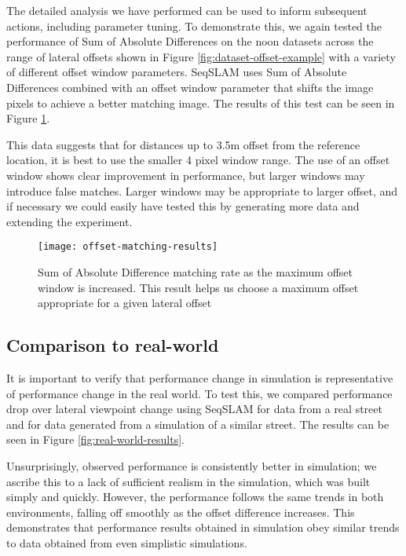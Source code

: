 \documentclass[letterpaper, 10 pt, conference]{ieeeconf}  %
\begin{document}
The detailed analysis we have performed can be used to inform subsequent actions, including parameter tuning. To demonstrate this, we again tested the performance of Sum of Absolute Differences on the noon datasets across the range of lateral offsets shown in Figure \ref{fig:dataset-offset-example} with a variety of different offset window parameters. SeqSLAM uses Sum of Absolute Differences combined with an offset window parameter that shifts the image pixels to achieve a better matching image. The results of this test can be seen in Figure \ref{fig:offset-matching-param-results}.

This data suggests that for distances up to 3.5m offset from the reference location, it is best to use the smaller 4 pixel window range. The use of an offset window shows clear improvement in performance, but larger windows may  introduce false matches. Larger windows may be appropriate to larger offset, and if necessary we could easily have tested this by generating more data and extending the experiment.

\begin{figure}[t]
    \texttt{[image: offset-matching-results]}
    \caption{Sum of Absolute Difference matching rate as the maximum offset window is increased. This result helps us choose a maximum offset appropriate for a given lateral offset}
    \label{fig:offset-matching-param-results}
\end{figure}

\subsection{Comparison to real-world}

It is important to verify that performance change in simulation is representative of performance change in the real world. To test this, we compared performance drop over lateral viewpoint change using SeqSLAM for data from a real street and for data generated from a simulation of a similar street. The results can be seen in Figure \ref{fig:real-world-results}.

Unsurprisingly, observed performance is consistently better in simulation; we ascribe this to a lack of sufficient realism in the simulation, which was built simply and quickly. However, the performance follows the same trends in both environments, falling off smoothly as the offset difference increases. This demonstrates that performance results obtained in simulation obey similar trends to data obtained from even simplistic simulations.
\end{document}
